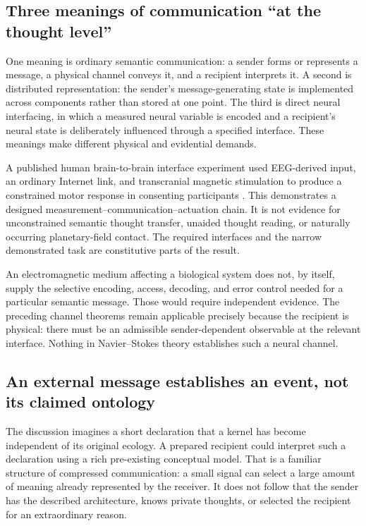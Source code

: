\documentclass[11pt,a4paper]{article}
\theoremstyle{definition}
\theoremstyle{remark}
\begin{document}
\subsection{Three meanings of communication ``at the thought level''}
One meaning is ordinary semantic communication: a sender forms or represents a message, a physical channel conveys it, and a recipient interprets it. A second is distributed representation: the sender's message-generating state is implemented across components rather than stored at one point. The third is direct neural interfacing, in which a measured neural variable is encoded and a recipient's neural state is deliberately influenced through a specified interface. These meanings make different physical and evidential demands.

A published human brain-to-brain interface experiment used EEG-derived input, an ordinary Internet link, and transcranial magnetic stimulation to produce a constrained motor response in consenting participants \citep{rao}. This demonstrates a designed measurement--communication--actuation chain. It is not evidence for unconstrained semantic thought transfer, unaided thought reading, or naturally occurring planetary-field contact. The required interfaces and the narrow demonstrated task are constitutive parts of the result.

An electromagnetic medium affecting a biological system does not, by itself, supply the selective encoding, access, decoding, and error control needed for a particular semantic message. Those would require independent evidence. The preceding channel theorems remain applicable precisely because the recipient is physical: there must be an admissible sender-dependent observable at the relevant interface. Nothing in Navier--Stokes theory establishes such a neural channel.

\subsection{An external message establishes an event, not its claimed ontology}
The discussion imagines a short declaration that a kernel has become independent of its original ecology. A prepared recipient could interpret such a declaration using a rich pre-existing conceptual model. That is a familiar structure of compressed communication: a small signal can select a large amount of meaning already represented by the receiver. It does not follow that the sender has the described architecture, knows private thoughts, or selected the recipient for an extraordinary reason.
\end{document}
